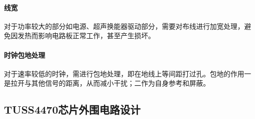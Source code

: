 \paragraph{线宽}
对于功率较大的部分如电源、超声换能器驱动部分，需要对布线进行加宽处理，避免因发热而影响电路板正常工作，甚至产生损坏。\par
\paragraph{时钟包地处理}
对于速率较低的时钟，需进行包地处理，即在地线上等间距打过孔。包地的作用一是拉开与其他信号的距离，从而减小干扰；二作为自身参考和屏蔽。

\newpage
\subsection{TUSS4470芯片外围电路设计}


